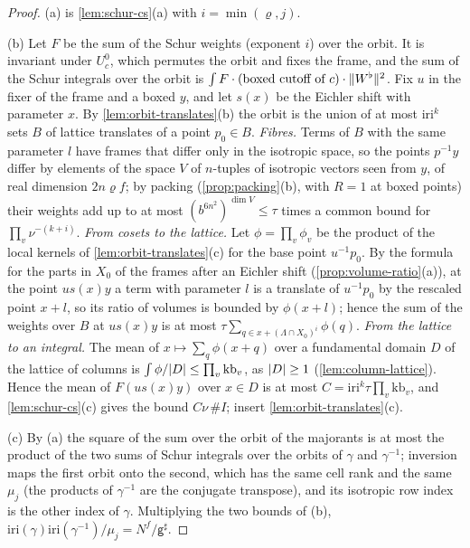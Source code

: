 \begin{proof}
(a) is \cref{lem:schur-cs}(a) with $i=\min(\varrho,j)$.

(b) Let $F$ be the sum of the Schur weights (exponent $i$) over the orbit. It is invariant under $U^0_c$, which permutes the orbit and fixes the frame, and the sum of the Schur integrals over the orbit is
$\int F\cdot(\text{boxed cutoff of }c)\cdot\lVert W^\flat\rVert^2$. Fix $u$ in the fixer of the frame and a boxed $y$, and let $s(x)$ be the Eichler shift with parameter $x$. By \cref{lem:orbit-translates}(b) the
orbit is the union of at most $\mathrm{iri}^k$ sets $B$ of lattice translates of a point $p_0\in B$. \emph{Fibres.} Terms of $B$ with the same parameter $l$ have frames that differ only in the isotropic space, so the
points $p^{-1}y$ differ by elements of the space $V$ of $n$-tuples of isotropic vectors seen from $y$, of real dimension $2n\varrho f$; by packing (\cref{prop:packing}(b), with $R=1$ at boxed points) their weights add up
to at most $(b^{6n^2})^{\dim V}\le\tau$ times a common bound for $\prod_v\nu^{-(k+i)}$. \emph{From cosets to the lattice.} Let $\phi=\prod_v\phi_v$ be the product of the local kernels of
\cref{lem:orbit-translates}(c) for the base point $u^{-1}p_0$. By the formula for the parts in $X_0$ of the frames after an Eichler shift (\cref{prop:volume-ratio}(a)), at the point $us(x)y$ a term with parameter $l$ is a
translate of $u^{-1}p_0$ by the rescaled point $x+l$, so its ratio of volumes is bounded by $\phi(x+l)$; hence the sum of the weights over $B$ at $us(x)y$ is at most $\tau\sum_{q\in x+(\Lambda\cap X_0)^i}\phi(q)$.
\emph{From the lattice to an integral.} The mean of $x\mapsto\sum_q\phi(x+q)$ over a fundamental domain $D$ of the lattice of columns is $\int\phi/\lvert D\rvert\le\prod_v\mathrm{kb}_v$, as $\lvert D\rvert\ge1$ (\cref{lem:column-lattice}).
Hence the mean of $F(us(x)y)$ over $x\in D$ is at most $C=\mathrm{iri}^k\tau\prod_v\mathrm{kb}_v$, and \cref{lem:schur-cs}(c) gives the bound $C\nu\,\#I$; insert \cref{lem:orbit-translates}(c).

(c) By (a) the square of the sum over the orbit of the majorants is at most the product of the two sums of Schur integrals over the orbits of $\gamma$ and $\gamma^{-1}$; inversion maps the first orbit onto the
second, which has the same cell rank and the same $\mu_j$ (the products of $\gamma^{-1}$ are the conjugate transpose), and its isotropic row index is the other index of $\gamma$. Multiplying the two bounds of (b),
$\mathrm{iri}(\gamma)\mathrm{iri}(\gamma^{-1})/\mu_j=N^f/\mathsf g^\sharp$.
\end{proof}


